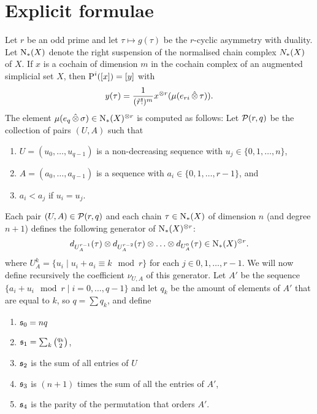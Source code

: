 
\section{Explicit formulae}\label{s:formulas} 

Let $r$ be an odd prime and let $\tau\mapsto g(\tau)$ be the $r$-cyclic asymmetry with duality. Let $\operatorname{N}_{*}(X)$ denote the right suspension of the normalised chain complex $N_{*}(X)$ of $X$. If $x$ is a cochain of dimension $m$ in the cochain complex of an augmented simplicial set $X$, then $\operatorname{P}^i([x]) = [y]$ with
\[	
	y(\tau) = \frac{1}{(\tilde{r}!)^{m}}x^{\otimes r}(\mu(e_{ri}\operatorname{\hat{\otimes}} \tau)).
\]
The element $\mu(e_{q}\operatorname{\hat{\otimes}} \sigma)\in \operatorname{N}_{*}(X)^{\otimes r}$ is computed as follows: Let $\mathcal{P}(r,q)$ be the collection of pairs $(U,A)$ such that 
\renewcommand{\theenumi}{\roman{enumi}}%
\begin{enumerate}
	\item $U = (u_0,\ldots,u_{q-1})$ is a non-decreasing sequence with $u_j\in \{0,1,\ldots,n\}$,
	\item $A = (a_0,\ldots,a_{q-1})$ is a sequence with $a_i\in \{0,1,\ldots,r-1\}$, and
	\item\label{condfor:3} $a_i<a_j$ if $u_i=u_j$.
\end{enumerate} 
Each pair $(U,A)\in \mathcal{P}(r,q)$ and each chain $\tau\in \operatorname{N}_{*}(X)$ of dimension $n$ (and degree $n+1$) defines the following generator of $\operatorname{N}_{*}(X)^{\otimes r}$:
\[
	d_{U_A^{r-1}}(\tau)\otimes d_{U_A^{r-2}}(\tau)\otimes \ldots\otimes d_{U_A^{0}}(\tau)\in \operatorname{N}_{*}(X)^{\otimes r}.
\] 
where $U_A^k = \{u_i\mid u_i + a_i \equiv k\mod r\}$ for each $j\in 0,1,\ldots,r-1$. We will now define recursively the coefficient $\nu_{U,A}$ of this generator. Let $A'$ be the sequence $\{a_i+u_i\mod r\mid i=0,\ldots,q-1\}$ and let $q_k$ be the amount of elements of $A'$ that are equal to $k$, so $q=\sum q_k$, and define
\renewcommand{\theenumi}{\arabic{enumi}}%
\begin{enumerate}
	\item $ \mathfrak{s}_0 = nq$
	\item $ \mathfrak{s}_1 = \sum_k\binom{q_k}{2}$,
	\item $ \mathfrak{s}_2$ is the sum of all entries of $U$
	\item $ \mathfrak{s}_3$ is $(n+1)$ times the sum of all the entries of $A'$,
	\item $ \mathfrak{s}_4$ is the parity of the permutation that orders $A'$.
\end{enumerate}
